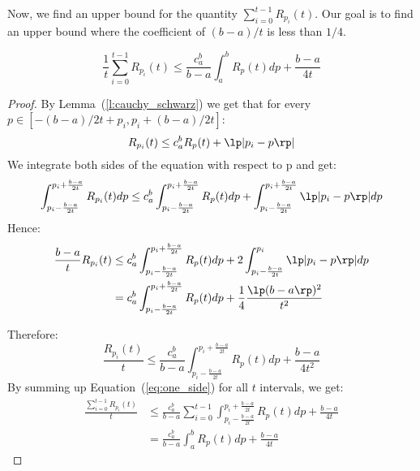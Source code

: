 Now, we find an upper bound for the quantity
$\sum_{i=0}^{t-1} R_{p_i}(t)$.
Our goal is to find an upper bound where the coefficient of
$(b-a)/t$ is less than $1/4$.

\begin{lemma}\label{l:upper}
  \[
    \frac{1}{t} \sum_{i=0}^{t-1}
    R_{p_i}(t) \leq
    \frac{c_a^b}{b-a} \int_a^b R_p(t) dp +
    \frac{b-a}{4t}
  \]
\end{lemma}
\begin{proof}
  By Lemma~(\ref{l:cauchy_schwarz}) we get that
  for every $p\in [-(b-a)/{2t} + p_i , p_i + (b-a)/{2t}]$:
  $$R_{p_i}(t) \leq  c_a^bR_p(t) + \lp|p_i - p\rp|$$
  We integrate both sides of the equation with respect to p and get:
  \[
    \int_{p_i - \frac{b-a}{2t}}^{p_i + \frac{b-a}{2t}} R_{p_i}(t) dp \leq c_a^b
    \int_{p_i - \frac{b-a}{2t}}^{p_i + \frac{b-a}{2t}}
    R_p(t) dp +
    \int_{p_i - \frac{b-a}{2t}}^{p_i + \frac{b-a}{2t}}\lp|p_i - p\rp| dp
  \]
  Hence:
  \begin{align*}
    \frac{b-a}{t} R_{p_i}(t)
    &\leq
    c_a^b\int_{p_i - \frac{b-a}{2t}}^{p_i+ \frac{b-a}{2t}}
    R_p(t) dp +
    2\int_{p_i - \frac{b-a}{2t}}^{p_i}\lp|p_i-p\rp|dp\\
    &= c_a^b\int_{p_i - \frac{b-a}{2t}}^{p_i + \frac{b-a}{2t}}
    R_p(t)
    dp + \frac{1}{4} \frac{\lp(b-a\rp)^2}{t^2}
  \end{align*}

  Therefore:
  \begin{equation}\label{eq:one_side}
    \frac{R_{p_i}(t)}{t} \leq \frac{c_a^b}{b-a}
    \int_{p_i - \frac{b-a}{2t}}^{p_i + \frac{b-a}{2t}}
    R_p(t) dp + \frac{b-a}{4t^2}
  \end{equation}
  By summing up Equation~(\ref{eq:one_side}) for all $t$ intervals, we get:
  \begin{align*}
    \frac{\sum_{i=0}^{t-1} R_{p_i}(t)}{t} &\leq \frac{c_a^b}{b-a} \sum_{i=0}^{t-1}
    \int_{p_i - \frac{b-a}{2t}}^{p_i+ \frac{b-a}{2t}}
    R_p(t) dp + \frac{b-a}{4t}\\
    &=
    \frac{c_a^b}{b-a} \int_a^b R_p(t) dp + \frac{b-a}{4t}
  \end{align*}
\end{proof}
